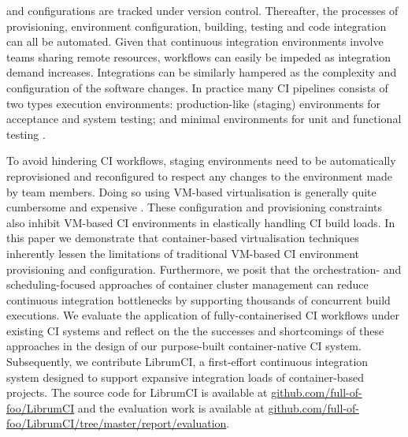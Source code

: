\documentclass[journal]{IEEEtran}
\begin{document}
and configurations are tracked under version control. Thereafter,
the processes of provisioning, environment configuration, building, testing and code integration
can all be automated. Given that continuous integration environments involve
teams sharing remote resources, workflows can easily 
be impeded as integration demand increases. Integrations can be similarly
hampered as the complexity and configuration of the software changes.
In practice many CI pipelines consists of two types execution environments:
production-like (staging) environments for acceptance and system testing; and minimal 
environments for unit and functional testing \citep{Guimaraes, Duvall}. 
\par
To avoid hindering CI workflows, staging environments need to be automatically 
reprovisioned and reconfigured to respect any changes to the environment made by team members.
Doing so using VM-based virtualisation is generally quite cumbersome and expensive \citep{Gambi}.
These configuration and provisioning constraints also inhibit
VM-based CI environments in elastically handling CI build loads. 
In this paper we demonstrate that container-based virtualisation
techniques inherently lessen the limitations of traditional VM-based CI environment
provisioning and configuration. Furthermore, we posit that
the orchestration- and scheduling-focused approaches of  
container cluster management can reduce continuous
integration bottlenecks by supporting thousands of concurrent build executions.
We evaluate the application of fully-containerised CI workflows under existing CI systems 
and reflect on the the successes and shortcomings of these approaches in the design of our purpose-built container-native
CI system. Subsequently, we contribute LibrumCI, a first-effort continuous integration system designed 
to support expansive integration loads of container-based projects. 
The source code for LibrumCI is available at 
\href{https://github.com/full-of-foo/LibrumCI}{github.com/full-of-foo/LibrumCI} and the evaluation work is available at 
\href{https://github.com/full-of-foo/LibrumCI/tree/master/report/evaluation}{github.com/full-of-foo/LibrumCI/tree/master/report/evaluation}.
\end{document}
